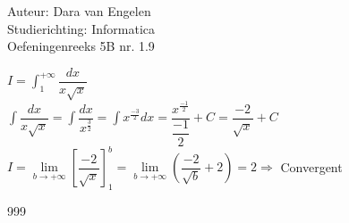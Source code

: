 \documentclass[a4paper]{article}
\begin{document}
	
\noindent \large Auteur: Dara van Engelen     \\
\noindent \large Studierichting: Informatica \\
\noindent \large Oefeningenreeks 5B nr. 1.9  \\
	
\medskip
	
\normalsize
	
$ I = \displaystyle\int_1^{+\infty} \dfrac{dx}{x\sqrt{x}}$\\
	
$\displaystyle\int \dfrac{dx}{x\sqrt{x}} = \displaystyle\int \dfrac{dx}{x^{\tfrac{3}{2}}} = \displaystyle\int x^{\tfrac{-3}{2}}dx = \dfrac{x^{\tfrac{-1}{2}}}{\dfrac{-1}{2}} +C = \dfrac{-2}{\sqrt{x}} + C$\\

	
$ I = \lim\limits_{b\rightarrow +\infty} \left[ \dfrac{-2}{\sqrt{x}} \right]_1^b = \lim\limits_{b\rightarrow +\infty} \left( \dfrac{-2}{\sqrt{b}} + 2\right) = 2 \Rightarrow$ Convergent\\
	
\begin{thebibliography}{999}
\end{thebibliography}
\end{document}
